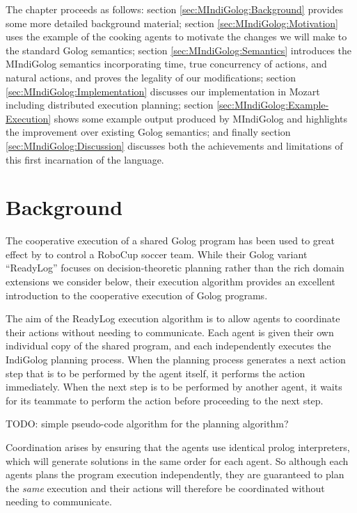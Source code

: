 The chapter proceeds as follows: section \ref{sec:MIndiGolog:Background}
provides some more detailed background material; section \ref{sec:MIndiGolog:Motivation}
uses the example of the cooking agents to motivate the changes we
will make to the standard Golog semantics; section \ref{sec:MIndiGolog:Semantics}
introduces the MIndiGolog semantics incorporating time, true concurrency
of actions, and natural actions, and proves the legality of our modifications;
section \ref{sec:MIndiGolog:Implementation} discusses our implementation
in Mozart including distributed execution planning; section \ref{sec:MIndiGolog:Example-Execution}
shows some example output produced by MIndiGolog and highlights the
improvement over existing Golog semantics; and finally section \ref{sec:MIndiGolog:Discussion}
discusses both the achievements and limitations of this first incarnation
of the language.


\section{Background\label{sec:MIndiGolog:Background}}

The cooperative execution of a shared Golog program has been used
to great effect by \citet{Ferrein2005readylog} to control a RoboCup
soccer team. While their Golog variant {}``ReadyLog'' focuses on
decision-theoretic planning rather than the rich domain extensions
we consider below, their execution algorithm provides an excellent
introduction to the cooperative execution of Golog programs.

The aim of the ReadyLog execution algorithm is to allow agents to
coordinate their actions without needing to communicate. Each agent
is given their own individual copy of the shared program, and each
independently executes the IndiGolog planning process. When the planning
process generates a next action step that is to be performed by the
agent itself, it performs the action immediately. When the next step
is to be performed by another agent, it waits for its teammate to
perform the action before proceeding to the next step.

TODO: simple pseudo-code algorithm for the planning algorithm?

Coordination arises by ensuring that the agents use identical prolog
interpreters, which will generate solutions in the same order for
each agent. So although each agents plans the program execution independently,
they are guaranteed to plan the \emph{same} execution and their actions
will therefore be coordinated without needing to communicate.

